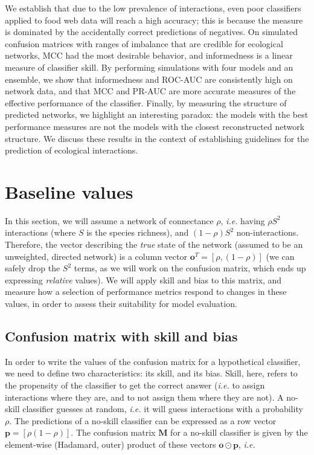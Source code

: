 \documentclass[10pt,oneside]{article}
\begin{document}
We establish that due to the low prevalence of interactions, even poor
classifiers applied to food web data will reach a high accuracy; this is
because the measure is dominated by the accidentally correct predictions
of negatives. On simulated confusion matrices with ranges of imbalance
that are credible for ecological networks, MCC had the most desirable
behavior, and informedness is a linear measure of classifier skill. By
performing simulations with four models and an ensemble, we show that
informedness and ROC-AUC are consistently high on network data, and that
MCC and PR-AUC are more accurate measures of the effective performance
of the classifier. Finally, by measuring the structure of predicted
networks, we highlight an interesting paradox: the models with the best
performance measures are not the models with the closest reconstructed
network structure. We discuss these results in the context of
establishing guidelines for the prediction of ecological interactions.

\hypertarget{baseline-values}{%
\section{Baseline values}\label{baseline-values}}

In this section, we will assume a network of connectance \(\rho\),
\emph{i.e.} having \(\rho S^2\) interactions (where \(S\) is the species
richness), and \((1-\rho) S^2\) non-interactions. Therefore, the vector
describing the \emph{true} state of the network (assumed to be an
unweighted, directed network) is a column vector
\(\mathbf{o}^T = [\rho, (1-\rho)]\) (we can safely drop the \(S^2\)
terms, as we will work on the confusion matrix, which ends up expressing
\emph{relative} values). We will apply skill and bias to this matrix,
and measure how a selection of performance metrics respond to changes in
these values, in order to assess their suitability for model evaluation.

\hypertarget{confusion-matrix-with-skill-and-bias}{%
\subsection{Confusion matrix with skill and
bias}\label{confusion-matrix-with-skill-and-bias}}

In order to write the values of the confusion matrix for a hypothetical
classifier, we need to define two characteristics: its skill, and its
bias. Skill, here, refers to the propensity of the classifier to get the
correct answer (\emph{i.e.} to assign interactions where they are, and
to not assign them where they are not). A no-skill classifier guesses at
random, \emph{i.e.} it will guess interactions with a probability
\(\rho\). The predictions of a no-skill classifier can be expressed as a
row vector \(\mathbf{p} = [\rho (1-\rho)]\). The confusion matrix
\(\mathbf{M}\) for a no-skill classifier is given by the element-wise
(Hadamard, outer) product of these vectors
\(\mathbf{o} \odot \mathbf{p}\), \emph{i.e.}
\end{document}
